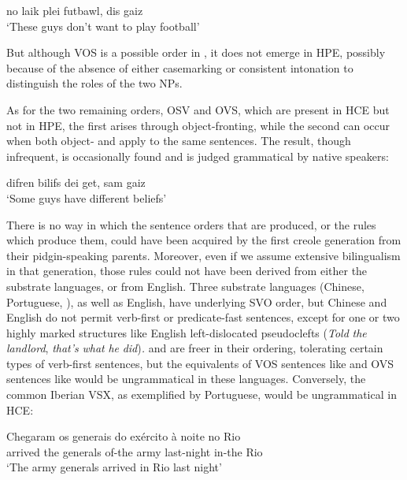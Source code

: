 

\ea\label{ex:27}
 no laik plei futbawl, dis gaiz\\
\glt  `These guys don't want to play football'
\z

\noindent But although VOS is a possible order in , it does not emerge in HPE, possibly because of the absence of either case\-marking or consistent intonation to distinguish the roles of the two NPs.

As for the two remaining orders, OSV and OVS, which are present in HCE but not in HPE, the first arises through object-fronting, while the second can occur when both object- and  apply to the same sentences. The result, though infrequent, is occasion\-ally found and is judged grammatical by native speakers:

\ea\label{ex:28}
 difren bilifs dei get, sam gaiz \\
\glt  `Some guys have different beliefs'
\z

There is no way in which the sentence orders that are produced, or the rules which produce them, could have been acquired by the first creole generation from their pidgin-speaking parents. Moreover, even if we assume extensive bilingualism in that generation, those rules could not have been derived from either the substrate languages, or from English. Three substrate languages (Chinese, Portuguese, ), as well as English, have underlying SVO order, but Chinese and English do not permit verb-first or predicate-fast sentences, except for one or two highly marked structures like English left-dislocated pseudo\-clefts (\textit{Told} \textit{the} \textit{landlord}, \textit{that's} \textit{what} \textit{he} \textit{did})\textit{.}  and  are freer in their ordering, tolerating certain types of verb-first sen\-tences, but the equivalents of VOS sentences like  and OVS sen\-tences like  would be ungrammatical in these languages. Conversely, the common Iberian VSX, as exemplified by Portuguese, would be ungrammatical in HCE:

\ea\label{ex:29}
 \gll Chegaram os generais do exército {à noite} no Rio\\ 
	  arrived the generals of-the army last-night in-the Rio\\
 \glt `The army generals arrived in Rio last night'
\glt 
\z


